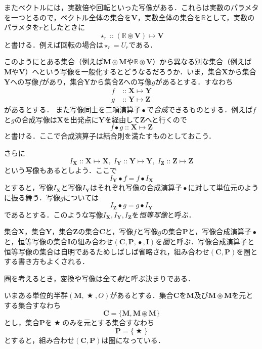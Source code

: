 \documentclass[twocolumn]{jsbook}
\newcommand{\keyword}[1]{{\emph{#1}}}
\DeclareMathOperator{\mathAnyBinaryOperator}{\bigstar}
\DeclareMathOperator{\mathAnyUnaryOperator}{\star}
\DeclareMathOperator{\mathCompose}{\bullet}
\DeclareMathOperator{\mathIn}{::}
\DeclareMathOperator{\mathMapsTo}{\mapsto}
\DeclareMathOperator{\mathSetTimes}{\circledast}
\newcommand{\mathSet}[1]{\mathbf{#1}}
\newcommand{\mathSpecialSet}[1]{\mathbb{#1}}
\newcommand{\mathCategoryShort}[2]{(#1,#2)}
\newcommand{\mathMorph}[2]{#1\mathMapsTo#2}
\newcommand{\mathMonoid}[3]{(#1,#2,#3)}
\newcommand{\mathCategory}[4]{(#1,#2,#3,#4)}
\begin{document}
またベクトルには，実数倍や回転といった写像がある．これらは実数のパラメタを一つとるので，ベクトル全体の集合を$\mathSet{V}$，実数全体の集合を$\mathSpecialSet{R}$として，実数のパラメタを$r$としたときに$$\mathAnyUnaryOperator_r\mathIn{}\mathMorph{(\mathSpecialSet{R}\mathSetTimes\mathSet{V})}{\mathSet{V}}$$と書ける．例えば回転の場合は$\mathAnyUnaryOperator_r=U_r$である．

このようにとある集合（例えば$\mathSet{M}\mathSetTimes\mathSet{M}$や$\mathSpecialSet{R}\mathSetTimes\mathSet{V}$）から異なる別な集合（例えば$\mathSet{M}$や$\mathSet{V}$）へという写像を一般化するとどうなるだろうか．いま，集合$\mathSet{X}$から集合$\mathSet{Y}$への写像$f$があり，集合$\mathSet{Y}$から集合$\mathSet{Z}$への写像$g$があるとする．すなわち
\begin{align*}
f&\mathIn\mathMorph{\mathSet{X}}{\mathSet{Y}}\\
g&\mathIn\mathMorph{\mathSet{Y}}{\mathSet{Z}}
\end{align*}
があるとする．
また写像同士を二項演算子$\mathCompose$で\keyword{合成}できるものとする．例えば$f$と$g$の合成写像は$\mathSet{X}$を出発点に$\mathSet{Y}$を経由して$\mathSet{Z}$へと行くので$$f\mathCompose g\mathIn\mathMorph{\mathSet{X}}{\mathSet{Z}}$$と書ける．ここで合成演算子は結合則を満たすものとしておこう．

さらに$$I_\mathSet{X}\mathIn\mathMorph{\mathSet{X}}{\mathSet{X}},\;I_\mathSet{Y}\mathIn\mathMorph{\mathSet{Y}}{\mathSet{Y}},\;I_\mathSet{Z}\mathIn\mathMorph{\mathSet{Z}}{\mathSet{Z}}$$という写像もあるとしよう．ここで$$I_\mathSet{Y}\mathCompose f=f\mathCompose I_\mathSet{X}$$とすると，写像$I_\mathSet{X}$と写像$I_\mathSet{Y}$はそれぞれ写像の合成演算子$\mathCompose$に対して単位元のように振る舞う．写像$g$については$$I_\mathSet{Z}\mathCompose g=g\mathCompose I_\mathSet{Y}$$であるとする．このような写像$I_\mathSet{X},I_\mathSet{Y},I_\mathSet{Z}$を\keyword{恒等写像}と呼ぶ．

集合$\mathSet{X}$，集合$\mathSet{Y}$，集合$\mathSet{Z}$の集合$\mathSet{C}$と，写像$f$と写像$g$の集合$\mathSet{P}$と，写像合成演算子$\mathCompose$と，恒等写像の集合$\mathSet{I}$の組み合わせ$\mathCategory{\mathSet{C}}{\mathSet{P}}{\mathCompose}{\mathSet{I}}$を\keyword{圏}と呼ぶ．写像合成演算子と恒等写像の集合は自明であるためしばしば省略され，組み合わせ$\mathCategoryShort{\mathSet{C}}{\mathSet{P}}$を圏とする書き方もよくされる．

圏を考えるとき，変換や写像は全て\keyword{射}と呼ぶ決まりである．

いまある単位的半群$\mathMonoid{\mathSet{M}}{\mathAnyBinaryOperator}{O}$があるとする．集合$\mathSet{C}$を$\mathSet{M}$及び$\mathSet{M}\mathSetTimes\mathSet{M}$を元とする集合すなわち$$\mathSet{C}=\{\mathSet{M},\mathSet{M}\mathSetTimes\mathSet{M}\}$$とし，集合$\mathSet{P}$を$\mathAnyBinaryOperator$のみを元とする集合すなわち$$\mathSet{P}=\{\mathAnyBinaryOperator\}$$とすると，組み合わせ$\mathCategoryShort{\mathSet{C}}{\mathSet{P}}$は圏になっている．
\end{document}
